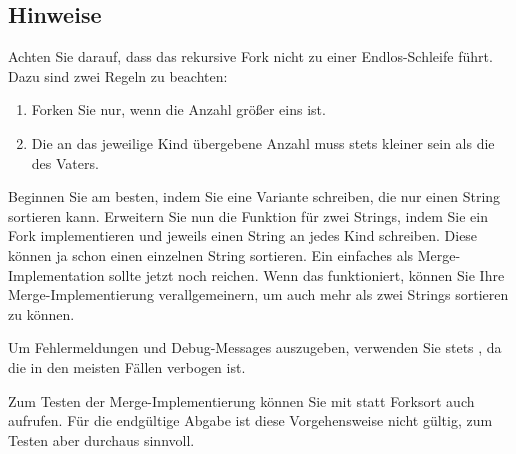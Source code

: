 \subsection*{Hinweise}
Achten Sie darauf, dass das rekursive Fork nicht zu einer Endlos-Schleife führt.
Dazu sind zwei Regeln zu beachten:
\begin{enumerate}
\item Forken Sie nur, wenn die Anzahl größer eins ist.
\item Die an das jeweilige Kind übergebene Anzahl muss stets kleiner sein als
  die des Vaters.
\end{enumerate}
Beginnen Sie am besten, indem Sie eine Variante schreiben, die nur einen String
sortieren kann. Erweitern Sie nun die Funktion für zwei Strings, indem Sie ein
Fork implementieren und jeweils einen String an jedes Kind schreiben. Diese
können ja schon einen einzelnen String sortieren. Ein einfaches
 als Merge-Implementation sollte jetzt noch reichen. Wenn
das funktioniert, können Sie Ihre Merge-Implementierung verallgemeinern, um auch
mehr als zwei Strings sortieren zu können.

Um Fehlermeldungen und Debug-Messages auszugeben, verwenden Sie stets
, da die  in den meisten Fällen verbogen
ist.

Zum Testen der Merge-Implementierung können Sie mit  statt
Forksort auch  aufrufen. Für die endgültige Abgabe ist diese
Vorgehensweise nicht gültig, zum Testen aber durchaus sinnvoll.

\osueguidelinestwo


